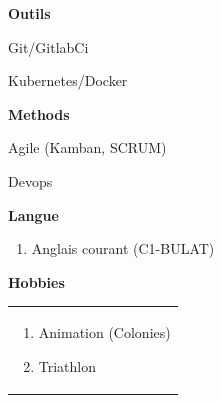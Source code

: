 \documentclass[a4paper,11pt,final]{memoir}
\newcommand{\SmallSep}{\vspace{0.2em}}
\newcommand{\CVSection}[1]
	{\Large\textbf{#1}\par
	\normalsize\normalfont}
\newcommand{\CVItem}[1]
	{\textbf{\color{RoyalBlue} #1}}
\begin{document}
\CVItem{Outils }
\begin{multicols}{2}
\begin{compactitem}[\color{RoyalBlue}$\circ$]
	\item Git/GitlabCi
	\item  Kubernetes/Docker
\end{compactitem}
\end{multicols}
\CVItem{Methods}
\begin{multicols}{2}
\begin{compactitem}[\color{RoyalBlue}$\circ$]
	\item Agile (Kamban, SCRUM)
	\item  Devops
\end{compactitem}
\end{multicols}


\noindent


\begin{multicols}{2}
\CVSection{Langue }
\begin{enumerate}[ \color{RoyalBlue}$\circ$]
  \item Anglais courant (C1-BULAT)\\
\end{enumerate}
\columnbreak

\CVSection{Hobbies}
\begin{tabular}{|p{\textwidth}}

\begin{enumerate}[\color{RoyalBlue}$\circ$]
  \item Animation (Colonies)
  \item Triathlon
\end{enumerate}

\end{tabular}
\end{multicols}

\SmallSep
\framebreak



\end{document}
